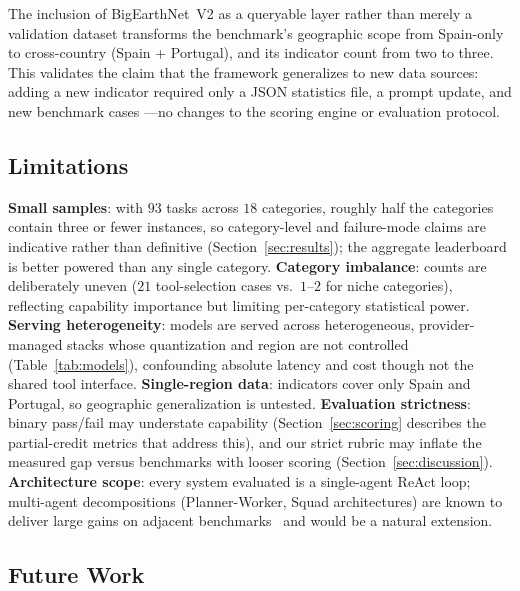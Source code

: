 \documentclass[sigconf]{acmart}
\begin{document}
The inclusion of BigEarthNet~V2 as a queryable layer rather than merely a validation dataset transforms the benchmark's geographic scope from Spain-only to cross-country (Spain + Portugal), and its indicator count from two to three. This validates the claim that the framework generalizes to new data sources: adding a new indicator required only a JSON statistics file, a prompt update, and new benchmark cases ---no changes to the scoring engine or evaluation protocol.

\subsection{Limitations}

\textbf{Small samples}: with $93$ tasks across $18$ categories, roughly half the categories contain three or fewer instances, so category-level and failure-mode claims are indicative rather than definitive (Section~\ref{sec:results}); the aggregate leaderboard is better powered than any single category. \textbf{Category imbalance}: counts are deliberately uneven ($21$ tool-selection cases vs.\ $1$--$2$ for niche categories), reflecting capability importance but limiting per-category statistical power. \textbf{Serving heterogeneity}: models are served across heterogeneous, provider-managed stacks whose quantization and region are not controlled (Table~\ref{tab:models}), confounding absolute latency and cost though not the shared tool interface. \textbf{Single-region data}: indicators cover only Spain and Portugal, so geographic generalization is untested. \textbf{Evaluation strictness}: binary pass/fail may understate capability (Section~\ref{sec:scoring} describes the partial-credit metrics that address this), and our strict rubric may inflate the measured gap versus benchmarks with looser scoring (Section~\ref{sec:discussion}). \textbf{Architecture scope}: every system evaluated is a single-agent ReAct loop; multi-agent decompositions (Planner-Worker, Squad architectures) are known to deliver large gains on adjacent benchmarks~\citep{luo2025geojsonagents, lee2025geollmsquad} and would be a natural extension.

\subsection{Future Work}
\end{document}
